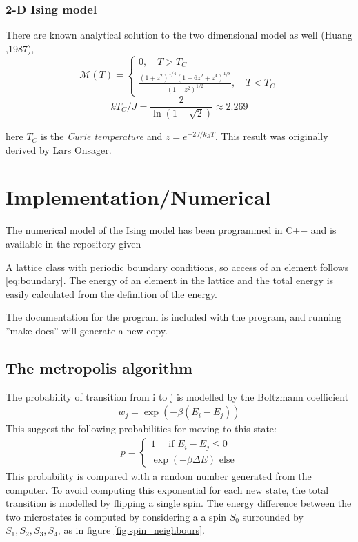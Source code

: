 \documentclass[11pt,a4paper,english]{article}
\numberwithin{equation}{section}
\newcommand{\magM}{\mathcal{M}}
\begin{document}
\subsubsection{2-D Ising model}
There are known analytical solution to the two dimensional model as well (Huang ,1987),
\begin{equation}
\magM (T) = \begin{cases} 0, \quad T > T_C \\ \frac{(1+z^2)^{1/4} (1-6z^2 + z^4 )^{1/8} }{(1-z^2)^{1/2}}, \quad T < T_C \end{cases}
\end{equation}
\begin{equation}
k T_C/J = \frac{2}{\ln(1+ \sqrt{2}) } \approx 2.269
\end{equation}

here $T_C$ is the \emph{Curie temperature} and $z = e^{-2J/k_B T}$. This result was originally derived by Lars Onsager.

\section{Implementation/Numerical}

The numerical model of the Ising model has been programmed in C++ and is 
available in the repository given 

A lattice class with periodic boundary conditions, so access of an
element follows \eqref{eq:boundary}. The energy of an element in the 
lattice and the total energy is easily calculated from the definition
of the energy. 

The documentation for the program is included with the program, and 
running ''make docs'' will generate a new copy.

\subsection{The metropolis algorithm}

The probability of transition from i to j 
is modelled by the Boltzmann coefficient
\begin{gather}
w_j = \exp(-\beta (E_i - E_j))
\end{gather}
This suggest the following probabilities for moving to this state:
\begin{gather}
p = \begin{cases}
1 \quad\text{ if }  E_i - E_j \le 0\\
\exp(-\beta \Delta E) \text{ else}
\end{cases}
\label{eq:transition}
\end{gather}
This probability is compared with a random number generated from 
the computer. To avoid computing this exponential for each new state,
the total transition is modelled by flipping a single spin. The energy 
difference between the two microstates is computed by considering 
a a spin $S_0$ surrounded by $S_1,S_2,S_3, S_4$, as in figure 
\ref{fig:spin_neighbours}.
\end{document}
